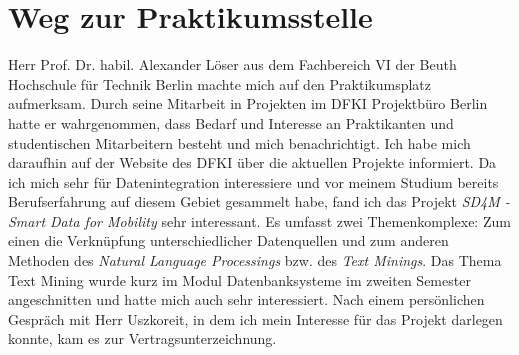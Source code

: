 \section{Weg zur Praktikumsstelle}
\label{sec:intro:wegZurPraktikumsstelle}
Herr Prof. Dr. habil. Alexander Löser aus dem Fachbereich VI der Beuth Hochschule für Technik Berlin machte mich auf den Praktikumsplatz aufmerksam. Durch seine Mitarbeit in Projekten im DFKI Projektbüro Berlin hatte er wahrgenommen, dass Bedarf und Interesse an Praktikanten und studentischen Mitarbeitern besteht und mich benachrichtigt.
Ich habe mich daraufhin auf der Website des DFKI über die aktuellen Projekte informiert.
Da ich mich sehr für Datenintegration interessiere und vor meinem Studium bereits Berufserfahrung auf diesem Gebiet gesammelt habe, fand ich das Projekt \textit{SD4M - Smart Data for Mobility} sehr interessant.
Es umfasst zwei Themenkomplexe: Zum einen die Verknüpfung unterschiedlicher Datenquellen und zum anderen Methoden des \textit{Natural Language Processings} bzw. des \textit{Text Minings}.
Das Thema Text Mining wurde kurz im Modul Datenbanksysteme im zweiten Semester angeschnitten und hatte mich auch sehr interessiert.
Nach einem persönlichen Gespräch mit Herr Uszkoreit, in dem ich mein Interesse für das Projekt darlegen konnte, kam es zur Vertragsunterzeichnung.
